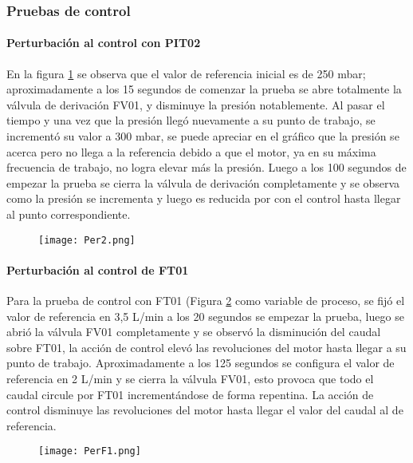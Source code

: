 {\subsubsection{Pruebas de control}
\paragraph{Perturbación al control con PIT02}
En la figura \ref{fig:per2} se observa que el valor de referencia inicial es de 250 mbar; aproximadamente a los 15 segundos de comenzar la prueba se abre totalmente la válvula de derivación FV01, y disminuye la presión notablemente. Al pasar el tiempo y una vez que la presión llegó nuevamente a su punto de trabajo, se incrementó su valor a 300 mbar, se puede apreciar en el gráfico que la presión se acerca pero no llega a la referencia debido a que el motor, ya en su máxima frecuencia de trabajo, no logra elevar más la presión. Luego a los 100 segundos de empezar la prueba se cierra la válvula de derivación completamente y se observa como la presión se incrementa y luego es reducida por con el control hasta llegar al punto correspondiente.
\begin{figure}[htb]
	\centering
	\texttt{[image: Per2.png]}
	\label{fig:per2}
\end{figure}

\paragraph{Perturbación al control de FT01}
Para la prueba de control con FT01 (Figura \ref{fig:per1} como variable de proceso, se fijó el valor de referencia en 3,5 L/min a los 20 segundos se empezar la prueba, luego se abrió la válvula FV01 completamente y se observó la disminución del caudal sobre FT01, la acción de control elevó las revoluciones del motor hasta llegar a su punto de trabajo. Aproximadamente a los 125 segundos se configura el valor de referencia en 2 L/min y se cierra la válvula FV01, esto provoca que todo el caudal circule por FT01 incrementándose de forma repentina. La acción de control disminuye las revoluciones del motor hasta llegar el valor del caudal al de referencia.

\begin{figure}[htb]
	\centering
	\texttt{[image: PerF1.png]}
	\label{fig:per1}
\end{figure}






}
